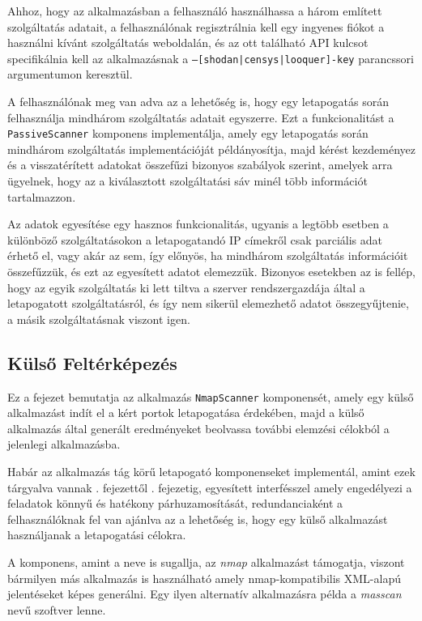 	Ahhoz, hogy az alkalmazásban a felhasználó használhassa a három említett szolgáltatás adatait, a felhasználónak regisztrálnia kell egy ingyenes fiókot a használni kívánt szolgáltatás weboldalán, és az ott található API kulcsot specifikálnia kell az alkalmazásnak a \texttt{--[shodan|censys|looquer]-key} parancssori argumentumon keresztül.
	
	A felhasználónak meg van adva az a lehetőség is, hogy egy letapogatás során felhasználja mindhárom szolgáltatás adatait egyszerre. Ezt a funkcionalitást a \texttt{PassiveScanner} komponens implementálja, amely egy letapogatás során mindhárom szolgáltatás implementációját példányosítja, majd kérést kezdeményez és a visszatérített adatokat összefűzi bizonyos szabályok szerint, amelyek arra ügyelnek, hogy az a kiválasztott szolgáltatási sáv minél több információt tartalmazzon.
	
	Az adatok egyesítése egy hasznos funkcionalitás, ugyanis a legtöbb esetben a különböző szolgáltatásokon a letapogatandó IP címekről csak parciális adat érhető el, vagy akár az sem, így előnyös, ha mindhárom szolgáltatás információit összefűzzük, és ezt az egyesített adatot elemezzük. Bizonyos esetekben az is fellép, hogy az egyik szolgáltatás ki lett tiltva a szerver rendszergazdája által a letapogatott szolgáltatásról, és így nem sikerül elemezhető adatot összegyűjtenie, a másik szolgáltatásnak viszont igen.

\subsection*{Külső Feltérképezés}

	Ez a fejezet bemutatja az alkalmazás \texttt{NmapScanner} komponensét, amely egy külső alkalmazást indít el a kért portok letapogatása érdekében, majd a külső alkalmazás által generált eredményeket beolvassa további elemzési célokból a jelenlegi alkalmazásba.
	
	Habár az alkalmazás tág körű letapogató komponenseket implementál, amint ezek tárgyalva vannak \az{\ref{icmpping}}. fejezettől \az{\ref{udpscan}}. fejezetig, egyesített interfésszel amely engedélyezi a feladatok könnyű és hatékony párhuzamosítását, redundanciaként a felhasználóknak fel van ajánlva az a lehetőség is, hogy egy külső alkalmazást használjanak a letapogatási célokra.
	
	A komponens, amint a neve is sugallja, az \textit{nmap} alkalmazást támogatja, viszont bármilyen más alkalmazás is használható amely nmap-kompatibilis XML-alapú jelentéseket képes generálni. Egy ilyen alternatív alkalmazásra példa a \textit{masscan} nevű szoftver lenne.
	
